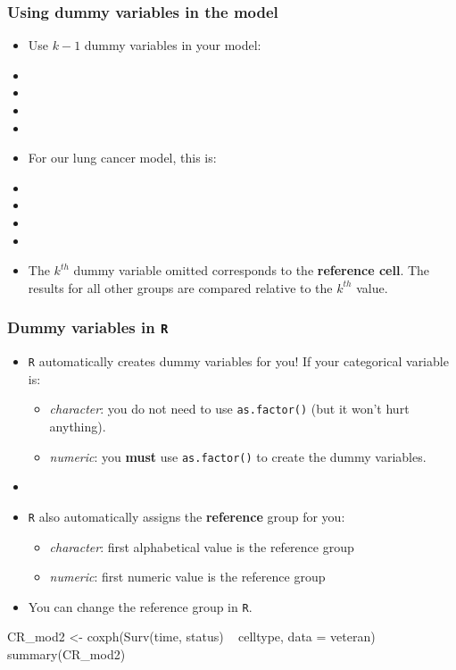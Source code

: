 \begin{frame}
\frametitle{Using dummy variables in the model}
\begin{itemize}
\item Use $k-1$ dummy variables in your model:
\item[]
\item[]
\item[]
\item[]
\item For our lung cancer model, this is:
\item[]
\item[]
\item[]
\item[]
\item The $k^{th}$ dummy variable omitted corresponds to the \textbf{reference cell}.  The results for all other groups are compared relative to the $k^{th}$ value.
\end{itemize}
\end{frame}


\begin{frame}[fragile]
\frametitle{Dummy variables in \texttt{R}}
\begin{itemize}
\item \texttt{R} automatically creates dummy variables for you! If your categorical variable is:
\begin{itemize}
\item \emph{character}: you do not need to use \texttt{as.factor()} (but it won't hurt anything).
\item \emph{numeric}: you \textbf{must} use \texttt{as.factor()} to create the dummy variables.
\end{itemize}
\item[]
\item \texttt{R} also automatically assigns the \textbf{reference} group for you:
\begin{itemize}
\item \emph{character}: first alphabetical value is the reference group
\item \emph{numeric}: first numeric value is the reference group
\end{itemize}
\item[] You can change the reference group in \texttt{R}.
\end{itemize}
\begin{Rcode}{-.05}
CR_mod2 <- coxph(Surv(time, status) ~ celltype, data = veteran)
summary(CR_mod2)
\end{Rcode}
\end{frame}

